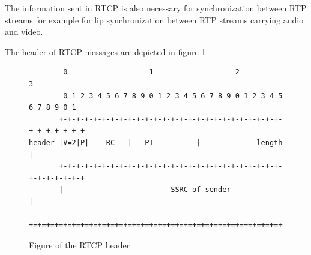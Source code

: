The information sent in RTCP is also necessary for synchronization between RTP streams for example for lip synchronization between RTP streams carrying audio and video.

The header of RTCP messages are depicted in figure \ref{fig:design:rtcp:header}

\begin{figure}[H]
	\centering
	\begin{verbatim}
        0                   1                   2                   3
        0 1 2 3 4 5 6 7 8 9 0 1 2 3 4 5 6 7 8 9 0 1 2 3 4 5 6 7 8 9 0 1
       +-+-+-+-+-+-+-+-+-+-+-+-+-+-+-+-+-+-+-+-+-+-+-+-+-+-+-+-+-+-+-+-+
header |V=2|P|    RC   |   PT          |             length            |
       +-+-+-+-+-+-+-+-+-+-+-+-+-+-+-+-+-+-+-+-+-+-+-+-+-+-+-+-+-+-+-+-+
       |                         SSRC of sender                        |
       +=+=+=+=+=+=+=+=+=+=+=+=+=+=+=+=+=+=+=+=+=+=+=+=+=+=+=+=+=+=+=+=+
	\end{verbatim}
	\caption{Figure of the RTCP header\citep{RFC3550}}
\label{fig:design:rtcp:header}
\end{figure}

